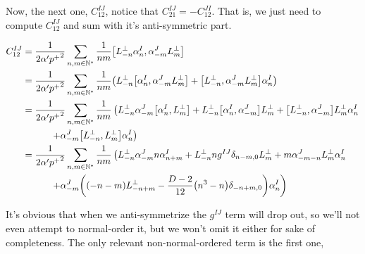 Now, the next one, $C_{12}^{IJ}$, notice that $C_{21}^{IJ}=-C_{12}^{JI}$. That is, we just need to compute $C_{12}^{IJ}$ 
and sum with it's anti-symmetric part.

\begin{align*}
    C_{12}^{IJ}&=\frac{1}{2\alpha'{p^+}^2}\sum\limits_{n,m\in\mathbb N^\ast}\frac{1}{nm}\comm{L^\perp_{-n}\alpha_n^I}{\alpha^J_{-m}L^\perp_m}\\
    &=\frac{1}{2\alpha'{p^+}^2}\sum\limits_{n,m\in\mathbb N^\ast}\frac{1}{nm}\qty(L^\perp_{-n}\comm{\alpha_n^I}{\alpha^J_{-m}L^\perp_m}+\comm{L^\perp_{-n}}{\alpha^J_{-m}L^\perp_m}\alpha_n^I)\\
    &=\frac{1}{2\alpha'{p^+}^2}\sum\limits_{n,m\in\mathbb N^\ast}\frac{1}{nm}\left(L^\perp_{-n}\alpha^J_{-m}\comm{\alpha_n^I}{L^\perp_m}+L^\perp_{-n}\comm{\alpha_n^I}{\alpha^J_{-m}}L^\perp_m+\comm{L^\perp_{-n}}{\alpha^J_{-m}}L^\perp_m\alpha_n^I\right.\\
    &\quad\quad\quad\left.+\alpha^J_{-m}\comm{L^\perp_{-n}}{L^\perp_m}\alpha_n^I\right)\\
    &=\frac{1}{2\alpha'{p^+}^2}\sum\limits_{n,m\in\mathbb N^\ast}\frac{1}{nm}\left(L^\perp_{-n}\alpha^J_{-m}n\alpha^I_{n+m}+L^\perp_{-n}ng^{IJ}\delta_{n-m,0}L^\perp_m+m\alpha^J_{-m-n}L^\perp_m\alpha_n^I\right.\\
    &\quad\quad\quad\left.+\alpha^J_{-m}\qty(\qty(-n-m)L^\perp_{-n+m}-\frac{D-2}{12}\qty(n^3-n)\delta_{-n+m,0})\alpha_n^I\right)
\end{align*}

It's obvious that when we anti-symmetrize the $g^{IJ}$ term will drop out, so we'll not even attempt to normal-order it, but we won't 
omit it either for sake of completeness. The only relevant non-normal-ordered term is the first one,

